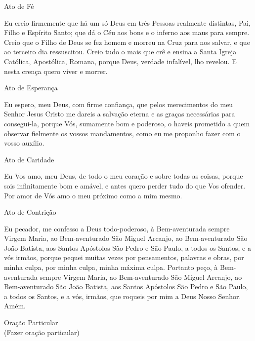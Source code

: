 \documentclass{book}
\begin{document}
\begin{center}
    Ato de Fé
\end{center}
\begin{flushleft}
    Eu creio firmemente que há um só Deus em três Pessoas realmente distintas, Pai, Filho e Espírito Santo; que dá o Céu aos bons e o inferno aos maus para sempre. Creio que o Filho de Deus se fez homem e morreu na Cruz para nos salvar, e que ao terceiro dia ressuscitou. Creio tudo o mais que crê e ensina a Santa Igreja Católica, Apostólica, Romana, porque Deus, verdade infalível, lho revelou. E nesta crença quero viver e morrer.
\end{flushleft}
\begin{center}
    Ato de Esperança
\end{center}
\begin{flushleft}
    Eu espero, meu Deus, com firme confiança, que pelos merecimentos do meu Senhor Jesus Cristo me dareis a salvação eterna e as graças necessárias para consegui-la, porque Vós, sumamente bom e poderoso, o haveis prometido a quem observar fielmente os vossos mandamentos, como eu me proponho fazer com o vosso auxílio.
\end{flushleft}
\begin{center}
    Ato de Caridade
\end{center}
\begin{flushleft}
    Eu Vos amo, meu Deus, de todo o meu coração e sobre todas as coisas, porque sois infinitamente bom e amável, e antes quero perder tudo do que Vos ofender. Por amor de Vós amo o meu próximo como a mim mesmo.
\end{flushleft}
\newpage
\begin{center}
    Ato de Contrição
\end{center}
\begin{flushleft}
    Eu pecador, me confesso a Deus todo-poderoso, à Bem-aventurada sempre Virgem Maria, ao Bem-aventurado São Miguel Arcanjo, ao Bem-aventurado São João Batista, aos Santos Apóstolos São Pedro e São Paulo, a todos os Santos, e a vós irmãos, porque pequei muitas vezes por pensamentos, palavras e obras, por minha culpa, por minha culpa, minha máxima culpa. Portanto peço, à Bem-aventurada sempre Virgem Maria, ao Bem-aventurado São Miguel Arcanjo, ao Bem-aventurado São João Batista, aos Santos Apóstolos São Pedro e São Paulo, a todos os Santos, e a vós, irmãos, que roqueis por mim a Deus Nosso Senhor. Amém.
\end{flushleft}
\begin{center}
    Oração Particular \\ \textcolor{VioletRed2}{\scriptsize{(Fazer oração particular)}}
\end{center}
\end{document}
